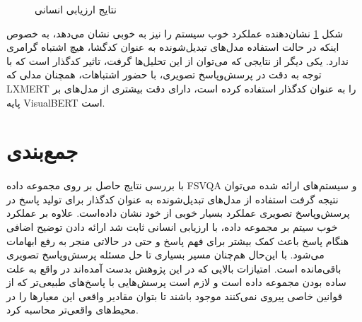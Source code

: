 {    \begin{figure}[H]
        \caption{نتایج ارزیابی انسانی}
        \label{fig:errors}
    \end{figure}

    شکل 
    \ref{fig:errors}
    نشان‌دهنده عملکرد خوب سیستم را نیز به خوبی نشان می‌دهد، به خصوص اینکه در 
    حالت استفاده مدل‌های تبدیل‌شونده به عنوان کدگشا، هیچ اشتباه گرامری ندارد. 
    یکی دیگر از نتایجی که می‌توان از این تحلیل‌ها گرفت، تاثیر کدگذار است که 
    با توجه به دقت در پرسش‌وپاسخ تصویری، با حضور اشتباهات، همچنان مدلی که 
    LXMERT
    را به عنوان کدگذار استفاده کرده است، دارای دقت بیشتری از 
    مدل‌های بر پایه 
    VisualBERT
    است. 
}
\section{جمع‌بندی}
\paragraph{}
{
    با بررسی نتایج حاصل بر روی مجموعه داده 
    FSVQA
    و سیستم‌های ارائه شده می‌توان نتیجه گرفت استفاده از مدل‌های تبدیل‌شونده 
    به عنوان کدگذار برای تولید پاسخ در پرسش‌وپاسخ تصویری عملکرد بسیار خوبی 
    از خود نشان داده‌است. علاوه بر عملکرد خوب سیتم بر مجموعه داده، با ارزیابی انسانی 
    ثابت شد ارائه دادن توضیح اضافی هنگام پاسخ باعث کمک بیشتر برای فهم پاسخ 
    و حتی در حالاتی منجر به رفع ابهامات می‌شود. با این‌حال هم‌چنان مسیر بسیاری 
    تا حل مسئله پرسش‌وپاسخ تصویری باقی‌مانده است. امتیازات بالایی که در این پژوهش بدست
    آمده‌اند در واقع به علت ساده بودن مجموعه داده است و لازم است
    پرسش‌هایی با پاسخ‌های طبیعی‌تر که از قوانین خاصی پیروی نمی‌کنند موجود
    باشند تا بتوان مقادیر واقعی این معیارها را در محیط‌های واقعی‌تر محاسبه کرد.
}